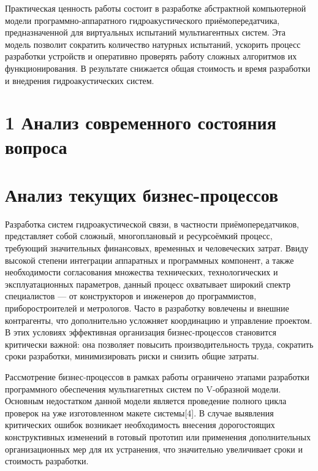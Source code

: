 Практическая ценность работы состоит в разработке абстрактной
компьютерной модели программно‑аппаратного гидроакустического
приёмопередатчика, предназначенной для виртуальных испытаний
мультиагентных систем. Эта модель позволит сократить количество натурных
испытаний, ускорить процесс разработки устройств и оперативно проверять
работу сложных алгоритмов их функционирования. В результате снижается
общая стоимость и время разработки и внедрения гидроакустических систем.

\section*{1 Анализ современного состояния
вопроса}\label{ux430ux43dux430ux43bux438ux437-ux441ux43eux432ux440ux435ux43cux435ux43dux43dux43eux433ux43e-ux441ux43eux441ux442ux43eux44fux43dux438ux44f-ux432ux43eux43fux440ux43eux441ux430}

\section{Анализ текущих
бизнес-процессов}\label{ux430ux43dux430ux43bux438ux437-ux442ux435ux43aux443ux449ux438ux445-ux431ux438ux437ux43dux435ux441-ux43fux440ux43eux446ux435ux441ux441ux43eux432}

Разработка систем гидроакустической связи, в частности
приёмопередатчиков, представляет собой сложный, многоплановый и
ресурсоёмкий процесс, требующий значительных финансовых, временных и
человеческих затрат. Ввиду высокой степени интеграции аппаратных и
программных компонент, а также необходимости согласования множества
технических, технологических и эксплуатационных параметров, данный
процесс охватывает широкий спектр специалистов --- от конструкторов и
инженеров до программистов, приборостроителей и метрологов. Часто в
разработку вовлечены и внешние контрагенты, что дополнительно усложняет
координацию и управление проектом. В этих условиях эффективная
организация бизнес-процессов становится критически важной: она позволяет
повысить производительность труда, сократить сроки разработки,
минимизировать риски и снизить общие затраты.

Рассмотрение бизнес-процессов в рамках работы ограничено этапами
разработки программного обеспечения мультиагетных систем по V-образной
модели. Основным недостатком данной модели является проведение полного
цикла проверок на уже изготовленном макете системы{[}4{]}. В случае
выявления критических ошибок возникает необходимость внесения
дорогостоящих конструктивных изменений в готовый прототип или применения
дополнительных организационных мер для их устранения, что значительно
увеличивает сроки и стоимость разработки.

